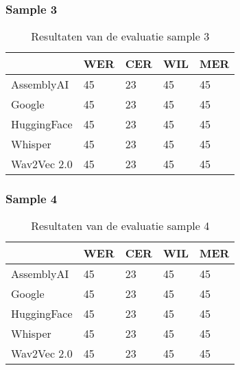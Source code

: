 \subsubsection{Sample 3}
\begin{table}[htbp]
    \centering
    \caption{Resultaten van de evaluatie sample 3}
    \label{tab:results_sample3}
    \begin{tabularx}{\textwidth}{|l|X|X|X|X|}
        \hline
        & \textbf{WER} & \textbf{CER} & \textbf{WIL} & \textbf{MER} \\ \hline
        AssemblyAI & 45 & 23 & 45 & 45 \\ \hline
        Google & 45 & 23 & 45 & 45 \\ \hline
        HuggingFace & 45 & 23 & 45 & 45 \\ \hline
        Whisper & 45 & 23 & 45 & 45 \\ \hline
        Wav2Vec 2.0 & 45 & 23 & 45 & 45 \\ \hline
    \end{tabularx}
\end{table}
\FloatBarrier

\subsubsection{Sample 4}
\begin{table}[htbp]
    \centering
    \caption{Resultaten van de evaluatie sample 4}
    \label{tab:results_sample4}
    \begin{tabularx}{\textwidth}{|l|X|X|X|X|}
        \hline
        & \textbf{WER} & \textbf{CER} & \textbf{WIL} & \textbf{MER} \\ \hline
        AssemblyAI & 45 & 23 & 45 & 45 \\ \hline
        Google & 45 & 23 & 45 & 45 \\ \hline
        HuggingFace & 45 & 23 & 45 & 45 \\ \hline
        Whisper & 45 & 23 & 45 & 45 \\ \hline
        Wav2Vec 2.0 & 45 & 23 & 45 & 45 \\ \hline
    \end{tabularx}
\end{table}
\FloatBarrier


